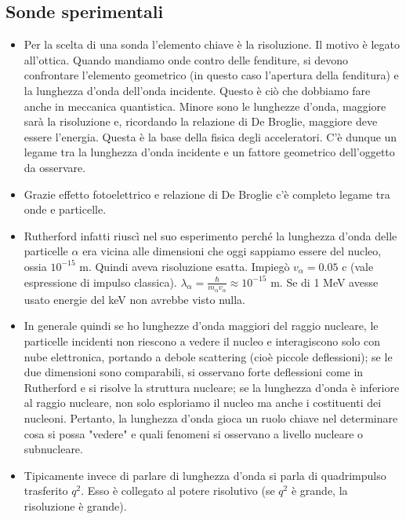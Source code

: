 \subsection{Sonde sperimentali}
\begin{itemize}
    \item Per la scelta di una sonda l'elemento chiave è la risoluzione. Il motivo è legato all'ottica. Quando mandiamo onde contro delle fenditure, si devono confrontare l'elemento geometrico (in questo caso l'apertura della fenditura) e la lunghezza d'onda dell'onda incidente. Questo è ciò che dobbiamo fare anche in meccanica quantistica. Minore sono le lunghezze d'onda, maggiore sarà la risoluzione e, ricordando la relazione di De Broglie, maggiore deve essere l'energia. Questa è la base della fisica degli acceleratori. C'è dunque un legame tra la lunghezza d'onda incidente e un fattore geometrico dell'oggetto da osservare.
    \item Grazie effetto fotoelettrico e relazione di De Broglie c'è completo legame tra onde e particelle. 
    \item Rutherford infatti riuscì nel suo esperimento perché la lunghezza d'onda delle particelle $\alpha$ era vicina alle dimensioni che oggi sappiamo essere del nucleo, ossia $10^{-15}$ m. Quindi aveva risoluzione esatta. Impiegò $v_\alpha=0.05$ c (vale espressione di impulso classica). $\lambda_\alpha=\frac\hbar{m_\alpha v_\alpha}\approx 10^{-15}$ m. Se di 1 MeV avesse usato energie del keV non avrebbe visto nulla. 
    \item In generale quindi se ho lunghezze d'onda maggiori del raggio nucleare, le particelle incidenti non riescono a vedere il nucleo e interagiscono solo con nube elettronica, portando a debole scattering (cioè piccole deflessioni); se le due dimensioni sono comparabili, si osservano forte deflessioni come in Rutherford e si risolve la struttura nucleare; se la lunghezza d'onda è inferiore al raggio nucleare, non solo esploriamo il nucleo ma anche i costituenti dei nucleoni. Pertanto, la lunghezza d'onda gioca un ruolo chiave nel determinare cosa si possa "vedere" e quali fenomeni si osservano a livello nucleare o subnucleare.
    \item Tipicamente invece di parlare di lunghezza d'onda si parla di quadrimpulso trasferito $q^2$. Esso è collegato al potere risolutivo (se $q^2$ è grande, la risoluzione è grande).
\end{itemize}
